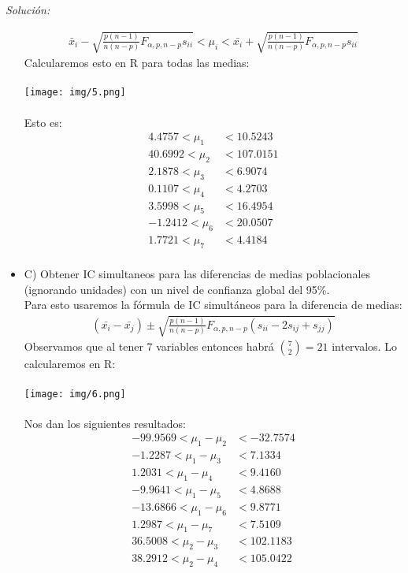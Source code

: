\documentclass[12pt]{article}
\newenvironment{sol}
    {\emph{Solución:}
    }
    {
    }
\begin{document}
\begin{sol}
\begin{itemize}
\begin{align*}
\bar{x}_i-\sqrt{\frac{p(n-1)}{n(n-p)}F_{\alpha,p,n-p}s_{ii}}<\mu_i<\bar{x_i}+\sqrt{\frac{p(n-1)}{n(n-p)}F_{\alpha,p,n-p}s_{ii}}
\end{align*}
Calcularemos esto en R para todas las medias:\\\\
\texttt{[image: img/5.png]}\\\\
Esto es:
\begin{align*}
 4.4757 < \mu_1 &< 10.5243 \\
 40.6992 < \mu_2 &< 107.0151 \\
 2.1878 < \mu_3 &< 6.9074 \\
0.1107 < \mu_4 &< 4.2703 \\
3.5998 < \mu_5 &< 16.4954 \\
 -1.2412 < \mu_6 &< 20.0507 \\
 1.7721 < \mu_7 &< 4.4184 \\
\end{align*}
\pagebreak
\item C) Obtener IC simultaneos para las diferencias de medias poblacionales (ignorando  
unidades) con un nivel de confianza global del 95\%. \\
Para esto usaremos la fórmula de IC simultáneos para la diferencia de medias:
\begin{align*}
(\bar{x_i}-\bar{x_j}) \pm \sqrt{\frac{p(n-1)}{n(n-p)}F_{\alpha,p,n-p}(s_{ii}-2s_{ij}+s_{jj})}
\end{align*}
Observamos que al tener 7 variables entonces habrá $\binom{7}{2} = 21$ intervalos. Lo calcularemos en R:\\\\
\texttt{[image: img/6.png]}\\\\
Nos dan los siguientes resultados:
\begin{align*}
 -99.9569 < \mu_{1} - \mu_{2} &< -32.7574 \\
 -1.2287 < \mu_{1} - \mu_{3} &< 7.1334 \\
 1.2031 < \mu_{1} - \mu_{4} &< 9.4160 \\
 -9.9641 < \mu_{1} - \mu_{5} &< 4.8688 \\
 -13.6866 < \mu_{1} - \mu_{6} &< 9.8771 \\
 1.2987 < \mu_{1} - \mu_{7} &< 7.5109 \\
 36.5008 < \mu_{2} - \mu_{3} &< 102.1183 \\
 38.2912 < \mu_{2} - \mu_{4} &< 105.0422 \\

\end{align*}
\end{itemize}
\end{sol}
\end{document}
